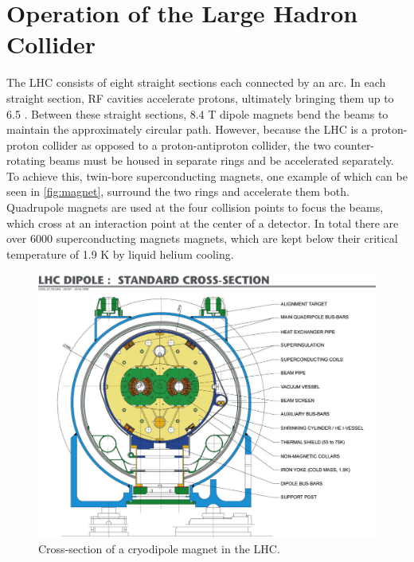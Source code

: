 \section{Operation of the Large Hadron Collider}

The \ac{LHC} consists of eight straight sections each connected by an arc. In each straight section, \ac{RF} cavities accelerate protons, ultimately bringing them up to 6.5 \gev. Between these straight sections, 8.4 T dipole magnets bend the beams to maintain the approximately circular path. However, because the \ac{LHC} is a proton-proton collider as opposed to a proton-antiproton collider, the two counter-rotating beams must be housed in separate rings and be accelerated separately. To achieve this, twin-bore superconducting magnets, one example of which can be seen in \autoref{fig:magnet}, surround the two rings and accelerate them both. Quadrupole magnets are used at the four collision points to focus the beams, which cross at an interaction point at the center of a detector. In total there are over 6000 superconducting magnets magnets, which are kept below their critical temperature of 1.9 K by liquid helium cooling. 

\begin{centering}
\begin{figure}[!hbt]
\myfloatalign
\includegraphics[width=.90\linewidth]{figures/lhc/magnet.jpg}
\caption{Cross-section of a cryodipole magnet in the \ac{LHC}.}
\label{fig:magnet}
\end{figure}
\end{centering}

